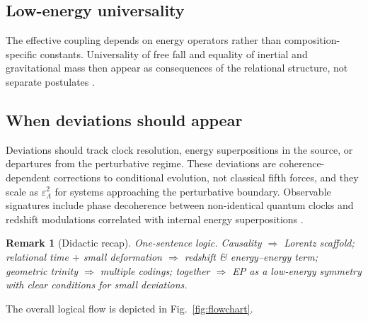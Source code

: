 \documentclass[11pt,a4paper]{article}
\theoremstyle{thmstyleone}
\theoremstyle{thmstyletwo}
\newtheorem{remark}{Remark}
\theoremstyle{thmstylethree}
\newcommand{\epsilonL}{\varepsilon_\Lambda} %
\begin{document}
    \subsection{Low-energy universality}\label{subsec:universality}
        The effective coupling depends on energy operators rather than composition-specific constants. Universality of free fall and equality of inertial and gravitational mass then appear as consequences of the relational structure, not separate postulates \cite{SinghFriedrich2025,ManciniTinoCapozziello2025}.

    \subsection{When deviations should appear}\label{subsec:deviations}
        Deviations should track clock resolution, energy superpositions in the source, or departures from the perturbative regime. These deviations are coherence-dependent corrections to conditional evolution, not classical fifth forces, and they scale as $\epsilonL^2$ for systems approaching the perturbative boundary. Observable signatures include phase decoherence between non-identical quantum clocks and redshift modulations correlated with internal energy superpositions \cite{SmithAhmadi2020,CastroRuiz2017}.

        \begin{remark}[Didactic recap]
            \emph{One-sentence logic.} Causality $\Rightarrow$ Lorentz scaffold; relational time $+$ small deformation $\Rightarrow$ redshift \& energy–energy term; geometric trinity $\Rightarrow$ multiple codings; together $\Rightarrow$ EP as a low-energy symmetry with clear conditions for small deviations.
        \end{remark}

        The overall logical flow is depicted in Fig.~\ref{fig:flowchart}.
\end{document}
